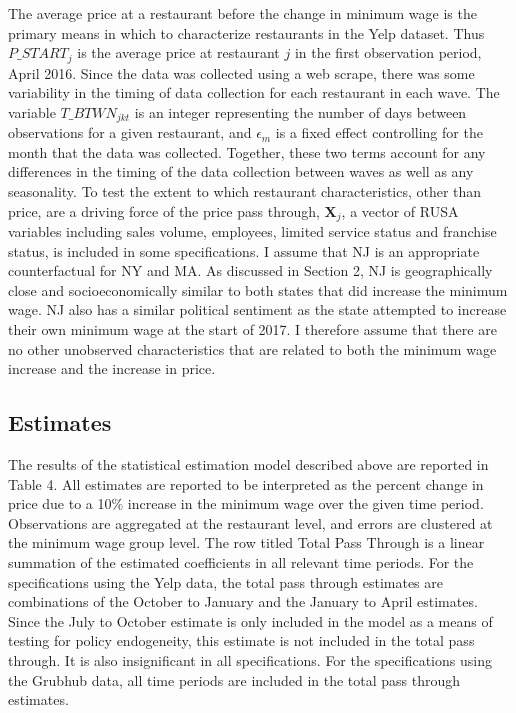 \documentclass[11pt]{article}
\begin{document}
The average price at a restaurant before the change in minimum wage is the primary means in which to characterize restaurants in the Yelp dataset. Thus $P\_START_{j}$ is the average price at restaurant $j$ in the first observation period, April 2016. Since the data was collected using a web scrape, there was some variability in the timing of data collection for each restaurant in each wave. The variable $T\_BTWN_{jkt}$ is an integer representing the number of days between observations for a given restaurant, and $\epsilon_m$ is a fixed effect controlling for the month that the data was collected. Together, these two terms account for any differences in the timing of the data collection between waves as well as any seasonality. To test the extent to which restaurant characteristics, other than price, are a driving force of the price pass through, $\boldsymbol{X}_j$, a vector of RUSA variables including sales volume, employees, limited service status and franchise status, is included in some specifications. I assume that NJ is an appropriate counterfactual for NY and MA. As discussed in Section 2, NJ is geographically close and socioeconomically similar to both states that did increase the minimum wage. NJ also has a similar political sentiment as the state attempted to increase their own minimum wage at the start of 2017. I therefore assume that there are no other unobserved characteristics that are related to both the minimum wage increase and the increase in price. 




\subsection{Estimates}

The results of the statistical estimation model described above are reported in Table 4. All estimates are reported to be  interpreted as the percent change in price due to a 10\% increase in the minimum wage over the given time period. Observations are aggregated at the restaurant level, and errors are clustered at the minimum wage group level. The row titled Total Pass Through is a linear summation of the estimated coefficients in all relevant time periods. For the specifications using the Yelp data, the total pass through estimates are combinations of the October to January and the January to April estimates. Since the July to October estimate is only included in the model as a means of testing for policy endogeneity, this estimate is not included in the total pass through. It is also insignificant in all specifications. For the specifications using the Grubhub data, all time periods are included in the total pass through estimates. 
\end{document}
